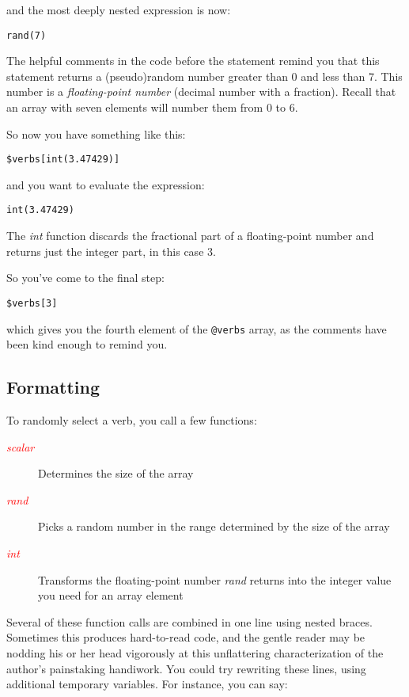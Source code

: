 and the most deeply nested expression is now:

\begin{lstlisting}
rand(7)
\end{lstlisting}

The helpful comments in the code before the statement remind you that this statement returns a (pseudo)random number greater than 0 and less than 7. This number is a \textit{floating-point number} (decimal number with a fraction). Recall that an array with seven elements will number them from 0 to 6.

So now you have something like this:

\begin{lstlisting}
$verbs[int(3.47429)] 
\end{lstlisting}

and you want to evaluate the expression:

\begin{lstlisting}
int(3.47429) 
\end{lstlisting}

The \textit{int} function discards the fractional part of a floating-point number and returns just the integer part, in this case 3.

So you've come to the final step:

\begin{lstlisting}
$verbs[3]
\end{lstlisting}

which gives you the fourth element of the \verb|@verbs| array, as the comments have been kind enough to remind you. 

\subsection{Formatting}
To randomly select a verb, you call a few functions: 

\begin{description}
  \item[\textcolor{red}{\textit{scalar}}] Determines the size of the array 
  \item[\textcolor{red}{\textit{rand}}] Picks a random number in the range determined by the size of the array 
  \item[\textcolor{red}{\textit{int}}] Transforms the floating-point number \textit{rand} returns into the integer value you need for an array element 
\end{description}

Several of these function calls are combined in one line using nested braces. Sometimes this produces hard-to-read code, and the gentle reader may be nodding his or her head vigorously at this unflattering characterization of the author's painstaking handiwork. You could try rewriting these lines, using additional temporary variables. For instance, you can say:


